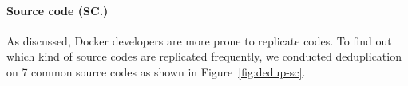 


\paragraph{Source code (SC.)}


As discussed, Docker developers are more prone to replicate codes. 
To find out which kind of source codes are replicated frequently, we conducted deduplication on 7 common source codes as shown in Figure~\ref{fig:dedup-sc}.

